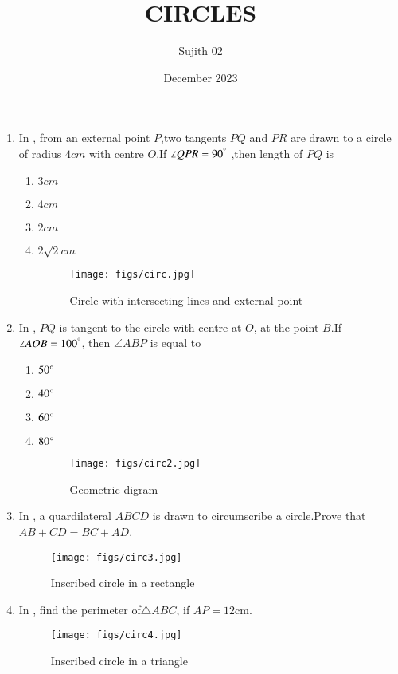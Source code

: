 \documentclass[12pt,-letter paper]{article}
\title{CIRCLES}
\author{Sujith 02}
\date{December 2023}
\begin{document}
\maketitle
\begin{enumerate}
\item In , from an external point $P$,two tangents $PQ$ and $PR$ are drawn to a circle of radius $4cm$ with centre $O$.If $\angle QPR=90^\degree$ ,then length of $PQ$ is 
\begin{enumerate}[label=(\Alph*)]
\item $3cm$
\item $4cm$
\item $2cm$
\item $2\sqrt{2}cm$
\begin{figure}[H]
\centering
\texttt{[image: figs/circ.jpg]}
\caption{Circle with intersecting lines and external point}
\label{fig:circ.jpg}
\end{figure}
\end{enumerate}
\item In , $PQ$ is tangent to the circle with centre at $O$, at the point $B$.If $\angle AOB=100^\degree$, then $\angle ABP$ is equal to
\begin{enumerate}[label=(\Alph*)]
\item $50\degree$
\item $40\degree$
\item $60\degree$
\item $80\degree$
\begin{figure}[H]
\centering                                       
\texttt{[image: figs/circ2.jpg]}  
\caption{Geometric digram}
\label{fig:circ2.jpg}                      
\end{figure}
\end{enumerate}
\item In , a quardilateral $ABCD$ is drawn to circumscribe a circle.\newline Prove that \newline $AB+CD=BC+AD$.
\begin{figure}[H]
\centering
\texttt{[image: figs/circ3.jpg]}
\caption{Inscribed circle in a rectangle}
\label{fig:circ3.pjpg}
\end{figure}
\item In , find the perimeter of$\triangle{ABC}$, if $AP=12$cm.
\begin{figure}[H]
\centering
\texttt{[image: figs/circ4.jpg]}
\caption{Inscribed circle in a triangle}
\label{fig:circ4.jpg}
\end{figure}
\end{enumerate}
\end{document}

